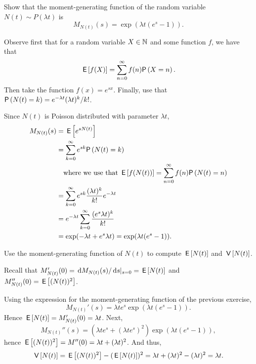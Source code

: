 \begin{exercise}
Show that the moment-generating function of the random variable~$N(t)\sim P(\lambda t)$ is
\begin{equation*}
M_{N(t)}(s) 
= \exp{(\lambda t(e^s-1))}.
\end{equation*}
  \begin{hint}Observe first that for a random variable $X\in\mathbb{N}$ and some function $f$, we have that
    \begin{equation*}
\E{f(X)}=\sum_{n=0}^\infty f(n) \P{X=n}.      
    \end{equation*}
Then take the function $f(x)=e^{s x}$. Finally, use that $\P{N(t)=k}=e^{-\lambda t}(\lambda t)^k/k!$.
  \end{hint}
\begin{solution}
Since $N(t)$ is Poisson distributed with parameter $\lambda t$, 
\begin{align*}
M_{N(t)}(s)
&=  \E{e^{s N(t)}} \\
&= \sum_{k=0}^\infty e^{s k} \P{N(t)=k} \\
&\quad\text{where we use that $\E{f(N(t))}=\sum_{n=0}^\infty f(n) \P{N(t)=n}$}\\
&= \sum_{k=0}^\infty e^{s k} \frac{(\lambda t)^k}{k!} e^{-\lambda t}  \\
&= e^{-\lambda t} \sum_{k=0}^\infty  \frac{(e^s \lambda t)^k}{k!}  \\
&= \exp(-\lambda t + e^s \lambda t) =\exp(\lambda t(e^s - 1)).
\end{align*}
\end{solution}
\end{exercise}

\begin{exercise}
Use  the moment-generating function of $N(t)$ to compute $\,\mathsf{E}\left[N(t)\right]$ and $\,\mathsf{V}\left[N(t)\right]$. 
\begin{hint}
  Recall that $M_{N(t)}'(0) = \,\text{d}M_{N(t)}(s)/\,\text{d}s|_{s=0} = \,\mathsf{E}\left[N(t)\right]$ and $M_{N(t)}''(0)= \,\mathsf{E}\left[(N(t))^2\right]$. 
\end{hint}
\begin{solution}
Using the expression for the moment-generating function of the previous exercise,
  \begin{equation*}
    M_{N(t)}'(s) = \lambda t e^s \exp(\lambda t(e^s - 1)).
  \end{equation*}
Hence $\,\mathsf{E}\left[N(t)\right] = M_{N(t)}'(0) = \lambda t $. Next, 
  \begin{equation*}
    M_{N(t)}''(s) = (\lambda t e^s + (\lambda t e^s)^2) \exp(\lambda t(e^s - 1)),
  \end{equation*}
hence $\,\mathsf{E}\left[(N(t))^2\right] = M''(0) = \lambda t + (\lambda t)^2$. And thus, 
\begin{equation*}
\,\mathsf{V}\left[N(t)\right] =\,\mathsf{E}\left[(N(t))^2\right]-(\,\mathsf{E}\left[N(t)\right])^2 = \lambda t + (\lambda t)^2 - (\lambda t)^2 = \lambda t.
\end{equation*}
\end{solution}
\end{exercise}

